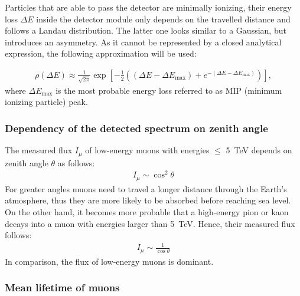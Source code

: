 Particles that are able to pass the detector are minimally ionizing, \ie their energy loss $\Delta E$ inside the detector module only depends on the travelled distance and follows a Landau distribution.
The latter one looks similar to a Gaussian, but introduces an asymmetry.
As it cannot be represented by a closed analytical expression, the following approximation \cite{landau} will be used:

\begin{align}
	\rho(\Delta E)\approx \frac{1}{\sqrt{2\pi}}\exp\left[ -\frac{1}{2}\left( \left(\Delta E-\Delta E_\text{max} \right) +e^{-\left(\Delta E-\Delta E_\text{max} \right)}\right) \right] ,
\end{align} 
where $\Delta E_\text{max}$ is the most probable energy loss referred to as MIP (minimum ionizing particle) peak.

\subsubsection{Dependency of the detected spectrum on zenith angle}

The measured flux $I_\mu$ of low-energy muons with energies $\leq$ \SI{5}{\tera\electronvolt} depends on zenith angle $\theta$ as follows:
\begin{align}
	I_\mu \sim \cos^2\theta
\end{align}
For greater angles muons need to travel a longer distance through the Earth's atmosphere, thus they are more likely to be absorbed before reaching sea level.
On the other hand, it becomes more probable that a high-energy pion or kaon decays into a muon with energies larger than \SI{5}{\tera\electronvolt}.
Hence, their measured flux follows:
\begin{align}
	I_\mu \sim \frac{1}{\cos\theta}
\end{align}
In comparison, the flux of low-energy muons is dominant.

\subsubsection{Mean lifetime of muons}


